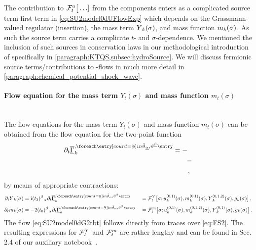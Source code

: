 The contribution to $\mathcal{F}_t^u\big[\ldots]$ from the \gmv{} components enters as a complicated source term \dash{} first term in \cref{eq:SU2model0dUFlowExp} \dash{} which depends on the Grassmann-valued regulator (insertion), the mass term $\FScoupling{Y}{0}{\sigma}$, and mass function $\FScoupling{m}{0}{\sigma}$.
As such the source term carries a complicate $t$- and $\sigma$-dependence.
We mentioned the inclusion of such sources in conservation laws in our methodological introduction of \cfd{} specifically in \cref{paragraph:KTQS,subsec:hydroSource}.
We will discuss fermionic source terms/contributions to \lpa{}-flows in much more detail in \cref{paragraph:chemical_potential_shock_wave}.

\paragraph{Flow equation for the mass term \texorpdfstring{$Y_t(\sigma)$}{Y} and mass function \texorpdfstring{$m_t(\sigma)$}{m}}\label{paragraph:0dSU2flowmY}\mbox{}\\%
The flow equations for the mass term $Y_t(\sigma)$ and mass function $m_t(\sigma)$ can be obtained from the flow equation for the \gmv{} two-point function
\begin{align}
\partial_t\FSvertexArg{\FSeaaEoM}{\MFthetab_{\underline{\alpha}},\MFtheta^{\underline{\beta}}}&=

-\notag\\
&\qquad
-\notag\\
&\qquad

\, , \label{eq:SU2model0dG2tbt}
\end{align}
by means of appropriate contractions:
\begin{alignat}{2}
	\partial_t \FScoupling{Y}{0}{\sigma} &= \iu \suIItij{3}{\beta}{\alpha}\vts \partial_t\FSvertexArg{\FSeaaEoM}{\MFthetab_{{\alpha}},\MFtheta^{{\beta}}} &&= \FRGflow_t^Y\big[\sigma;\FScoupling{u}{0,1}{\sigma},\FScoupling{m}{0,1}{\sigma},\FScoupling{Y}{0,1,2}{\sigma},\FScoupling{g}{0}{\sigma}\big]
	\label{eq:SU2model0dYFlow}\,,\\[.2em]
	\partial_t \FScoupling{m}{0}{\sigma} &= -2 \suIItij{0}{\beta}{\alpha}\vts \partial_t\FSvertexArg{\FSeaaEoM}{\MFthetab_{{\alpha}},\MFtheta^{{\beta}}} &&= \FRGflow_t^{\vts m}\big[\sigma;\FScoupling{u}{0,1}{\sigma},\FScoupling{m}{0,1,2}{\sigma},\FScoupling{Y}{0,1}{\sigma},\FScoupling{g}{0}{\sigma}\big]
	\label{eq:SU2model0dmFlow}\,.
\end{alignat}
The flow \cref{eq:SU2model0dG2tbt} follows directly from traces over \cref{eq:FS2}.
The resulting expressions for $\mathcal{F}_t^Y$ and $\mathcal{F}_t^m$ are rather lengthy and can be found in Sec. 2.4 of our auxiliary notebook~\cite{Steil:2023zeroDSU2}.\bigskip


